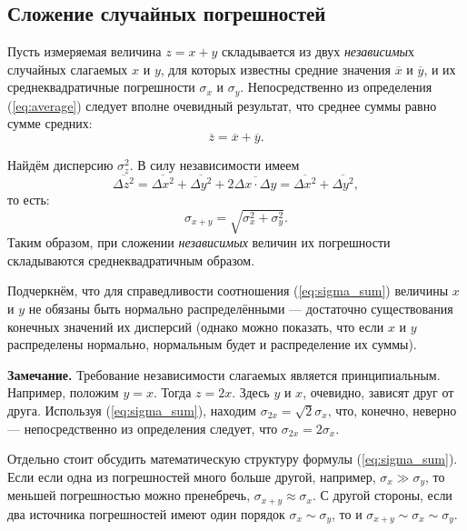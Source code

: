 \documentclass[10pt]{article}
\begin{document}
\subsection{Сложение случайных погрешностей\label{subsec:sum}}


Пусть измеряемая величина $z=x+y$ складывается из двух \emph{независимы}х
случайных слагаемых $x$ и $y$, для которых известны средние значения
$\overline{x}$ и $\overline{y}$, и их среднеквадратичные погрешности
$\sigma_{x}$ и $\sigma_{y}$. Непосредственно из определения (\ref{eq:average})
следует вполне очевидный результат, что среднее суммы равно сумме
средних: 
\[
\overline{z}=\overline{x}+\overline{y}.
\]

Найдём дисперсию $\sigma_{z}^{2}$. В силу независимости имеем
\[
\overline{\Delta z^{2}}=\overline{\Delta x^{2}}+\overline{\Delta y^{2}}+2\overline{\Delta x\cdot\Delta y}=\overline{\Delta x^{2}}+\overline{\Delta y^{2}},
\]
то есть:
\begin{equation}
\boxed{{\sigma_{x+y}=\sqrt{\sigma_{x}^{2}+\sigma_{y}^{2}}}}.\label{eq:sigma_sum}
\end{equation}
Таким образом, при сложении \emph{независимых }величин их погрешности
складываются среднеквадратичным образом.

Подчеркнём, что для справедливости соотношения (\ref{eq:sigma_sum})
величины $x$ и $y$ не обязаны быть нормально распределёнными ---
достаточно существования конечных значений их дисперсий (однако можно
показать, что если $x$ и $y$ распределены нормально, нормальным
будет и распределение их суммы).

\textbf{\footnotesize{}Замечание.}{\footnotesize{} Требование независимости
слагаемых является принципиальным. Например, положим $y=x$. Тогда
$z=2x$. Здесь $y$ и $x$, очевидно, зависят друг от друга. Используя
(\ref{eq:sigma_sum}), находим $\sigma_{2x}=\sqrt{2}\sigma_{x}$,
что, конечно, неверно --- непосредственно из определения
следует, что $\sigma_{2x}=2\sigma_{x}$.}{\footnotesize\par}

Отдельно стоит обсудить математическую структуру формулы (\ref{eq:sigma_sum}).
Если если одна из погрешностей много больше другой, например, $\sigma_{x}\gg\sigma_{y}$,
то меньшей погрешностью можно пренебречь, $\sigma_{x+y}\approx\sigma_{x}$.
С другой стороны, если два источника погрешностей имеют один порядок
$\sigma_{x}\sim\sigma_{y}$, то и $\sigma_{x+y}\sim\sigma_{x}\sim\sigma_{y}$. 
\end{document}
